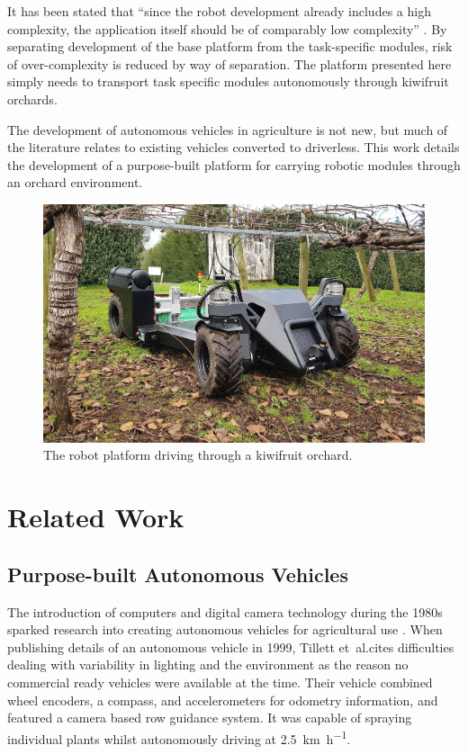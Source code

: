 \documentclass[preprint,authoryear,12pt]{elsarticle}
\begin{document}
    It has been stated that ``since the robot development already includes a high complexity, the application itself should be of comparably low complexity'' \citep{Ruckelshausen2009}.
    By separating development of the base platform from the task-specific modules, risk of over-complexity is reduced by way of separation.
    The platform presented here simply needs to transport task specific modules autonomously through kiwifruit orchards.

    The development of autonomous vehicles in agriculture is not new, but much of the literature relates to existing vehicles converted to driverless.
    This work details the development of a purpose-built platform for carrying robotic modules through an orchard environment.

    \begin{figure}[htb]
        \centering
        \includegraphics[width=\linewidth]{imgs/photos/suzy_general.jpg}
        \caption{
            The robot platform driving through a kiwifruit orchard.
        }
        \label{fig:suzy}
    \end{figure}

\section{Related Work}
\label{sect:review}

    \subsection{Purpose-built Autonomous Vehicles}

        The introduction of computers and digital camera technology during the 1980s sparked research into creating autonomous vehicles for agricultural use \cite{Li2009}.
        When publishing details of an autonomous vehicle in 1999, Tillett et~al.\@ cites difficulties dealing with variability in lighting and the environment as the reason no commercial ready vehicles were available at the time.
        Their vehicle combined wheel encoders, a compass, and accelerometers for odometry information, and featured a camera based row guidance system.
        It was capable of spraying individual plants whilst autonomously driving at \SI{2.5}{\kilo\meter\per\hour}.
        
\end{document}
